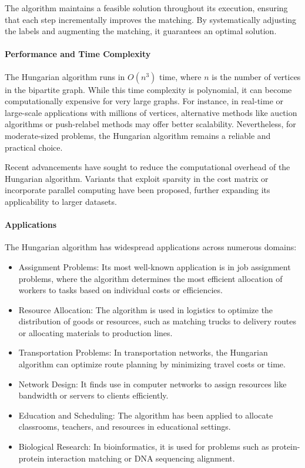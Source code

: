 The algorithm maintains a feasible solution throughout its execution, ensuring that each step incrementally improves the matching. By systematically adjusting the labels and augmenting the matching, it guarantees an optimal solution.

\paragraph{Performance and Time Complexity}
The Hungarian algorithm runs in \(O(n^3)\) time, where \(n\) is the number of vertices in the bipartite graph. While this time complexity is polynomial, it can become computationally expensive for very large graphs. For instance, in real-time or large-scale applications with millions of vertices, alternative methods like auction algorithms or push-relabel methods may offer better scalability. Nevertheless, for moderate-sized problems, the Hungarian algorithm remains a reliable and practical choice.

Recent advancements have sought to reduce the computational overhead of the Hungarian algorithm. Variants that exploit sparsity in the cost matrix or incorporate parallel computing have been proposed, further expanding its applicability to larger datasets.

\paragraph{Applications}
The Hungarian algorithm has widespread applications across numerous domains:
\begin{itemize}
    \item Assignment Problems: Its most well-known application is in job assignment problems, where the algorithm determines the most efficient allocation of workers to tasks based on individual costs or efficiencies.
    \item Resource Allocation: The algorithm is used in logistics to optimize the distribution of goods or resources, such as matching trucks to delivery routes or allocating materials to production lines.
    \item Transportation Problems: In transportation networks, the Hungarian algorithm can optimize route planning by minimizing travel costs or time.
    \item Network Design: It finds use in computer networks to assign resources like bandwidth or servers to clients efficiently.
    \item Education and Scheduling: The algorithm has been applied to allocate classrooms, teachers, and resources in educational settings.
    \item Biological Research: In bioinformatics, it is used for problems such as protein-protein interaction matching or DNA sequencing alignment.
\end{itemize}

